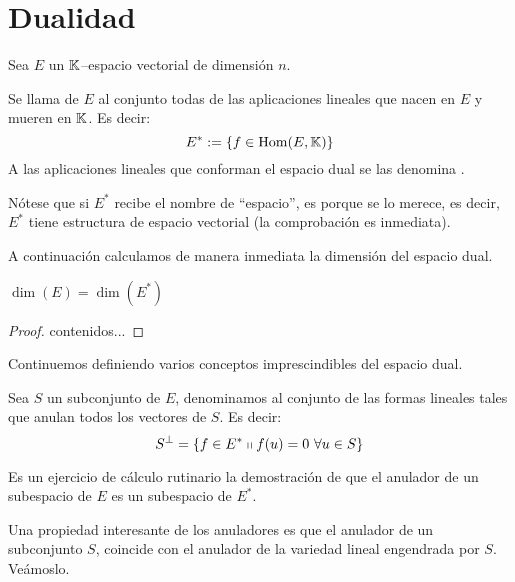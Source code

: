 \section{Dualidad}
Sea $E$ un $\mathbb{K}$--espacio vectorial de dimensión $n$.
\begin{defi}
	Se llama  de $E$ al conjunto todas de las aplicaciones lineales que nacen en $E$ y mueren en $\mathbb{K}$. Es decir:
	\[E^*:=\{f\in\mathrm{Hom}(E,\mathbb{K})\}\]
	A las aplicaciones lineales que conforman el espacio dual se las denomina .
\end{defi}
Nótese que si $E^*$ recibe el nombre de ``espacio'', es porque se lo merece, es decir, $E^*$ tiene estructura de espacio vectorial (la comprobación es inmediata).

A continuación calculamos de manera inmediata la dimensión del espacio dual.
\begin{lem}
	$\dim(E)=\dim(E^*)$
\end{lem}
\begin{proof}
	contenidos...
\end{proof}

Continuemos definiendo varios conceptos imprescindibles del espacio dual.
\begin{defi}
	Sea $S$ un subconjunto de $E$, denominamos  al conjunto de las formas lineales tales que anulan todos los vectores de $S$. Es decir:
	\[S^{\perp}=\{f\in E^*\tq f(u)=0\ \forall u\in S\}\]
\end{defi}
Es un ejercicio de cálculo rutinario la demostración de que el anulador de un subespacio de $E$ es un subespacio de $E^*$.

Una propiedad interesante de los anuladores es que el anulador de un subconjunto $S$, coincide con el anulador de la variedad lineal engendrada por $S$. Veámoslo.

